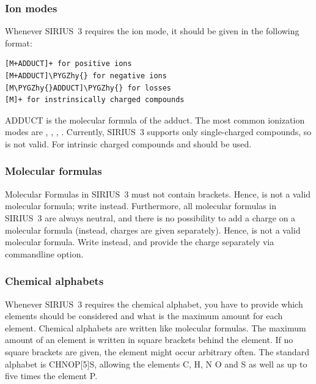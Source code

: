 \documentclass[letterpaper,10pt,openany,oneside]{sphinxmanual}
\def\PYGZhy{\char`\-}
\begin{document}
\subsubsection{Ion modes}
\label{commandline:ions}\label{commandline:ion-modes}
Whenever SIRIUS~3 requires the ion mode, it should be given in the following format:

\begin{Verbatim}[commandchars=\\\{\}]
[M+ADDUCT]+ for positive ions
[M+ADDUCT]\PYGZhy{} for negative ions
[M\PYGZhy{}ADDUCT]\PYGZhy{} for losses
[M]+ for instrinsically charged compounds
\end{Verbatim}

ADDUCT is the molecular formula of the adduct. The most common ionization modes are \code{{[}M+H{]}+}, \code{{[}M+Na{]}+}, \code{{[}M-H{]}-}, \code{{[}M+Cl{]}-}. Currently, SIRIUS~3 supports only single-charged compounds, so  is not valid. For intrinsic charged compounds \code{{[}M{]}+} and \code{{[}M{]}-} should be used.


\subsubsection{Molecular formulas}
\label{commandline:molecular-formulas}\label{commandline:formulas}

Molecular Formulas in SIRIUS~3 must not contain brackets.
Hence,  is not a valid molecular formula; write 
instead.  Furthermore, all molecular formulas in SIRIUS~3 are always neutral,
and there is no possibility to add a charge on a molecular formula (instead,
charges are given separately). Hence,  is not a valid molecular
formula.  Write  instead, and provide the charge separately via
commandline option.


\subsubsection{Chemical alphabets}
\label{commandline:alphabets}\label{commandline:chemical-alphabets}
Whenever SIRIUS~3 requires the chemical alphabet, you have to provide which elements should be considered and what is the maximum amount for each element. Chemical alphabets are written like molecular formulas. The maximum amount of an element is written in square brackets behind the element. If no square brackets are given, the element might occur arbitrary often. The standard alphabet is CHNOP{[}5{]}S, allowing the elements C, H, N O and S as well as up to five times the element P.
\end{document}
